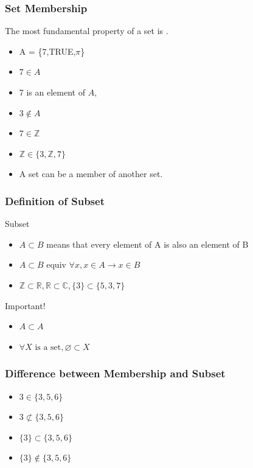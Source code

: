 \documentclass{beamer}
\begin{document}
\begin{frame}
  \frametitle{Set Membership}

  {\larger
  The most fundamental property of a set is .

  \bigskip

  \begin{itemize}
  \item A = \{7,TRUE,$\pi$\}
  \item $7 \in A$
  \item 7 is an element of $A$,
  \item $3 \notin A$

    \vfill

  \item $7 \in \mathbb{Z}$
  \item $\mathbb{Z} \in \{3, \mathbb{Z}, 7\}$
  \item A set can be a member of another set.    
  \end{itemize}
  }
\end{frame}

\begin{frame}
  \frametitle{Definition of Subset}
  {\larger
  \begin{block}{Subset}
    \begin{itemize}
    \item $A \subset B$ means that every element of A is also an element of B
    \item $A\subset B \text{ equiv }\forall x, x\in A \rightarrow x\in B$
    \item $\mathbb{Z} \subset \mathbb{R}, \mathbb{R} \subset \mathbb{C}, \{3\} \subset \{5,3,7\}$
    \end{itemize}
  \end{block}

  \begin{block}{Important!}
    \begin{itemize}
    \item $A \subset A$
    \item $\forall X\text{ is a set}, \varnothing \subset X$
    \end{itemize}
  \end{block}
  }
\end{frame}

\begin{frame}
  \frametitle{Difference between Membership and Subset}

  {\huge
  \begin{itemize}
  \item $3 \in \{3,5,6\}$
  \item $3 \not\subset \{3,5,6\}$
  \end{itemize}

  \vfill

  \begin{itemize}
  \item $\{3\} \subset \{3,5,6\}$
  \item $\{3\} \notin \{3,5,6\}$
  \end{itemize}
  }
\end{frame}
\end{document}
